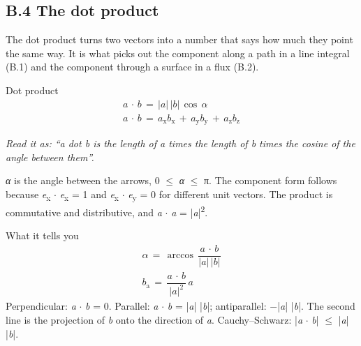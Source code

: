 \documentclass[11pt]{article}
\begin{document}
\begin{keepsection}
\section{B.4 The dot product}

The dot product turns two vectors into a number that says how much they point the same way. It is what picks out the component along a path in a line integral (B.1) and the component through a surface in a flux (B.2).

\begin{equationcard}{Dot product}
\[ \begin{gathered} {a}\, \cdot \, {b}\, =\, |{a}|\, |{b}|\, \cos \, {α} \\ {a}\, \cdot \, {b}\, =\, {a}_{\mathrm{x}}{b}_{\mathrm{x}}\, +\, {a}_{\mathrm{y}}{b}_{\mathrm{y}}\, +\, {a}_{\mathrm{z}}{b}_{\mathrm{z}} \end{gathered} \]
{\small \emph{Read it as: “a dot b is the length of a times the length of b times the cosine of the angle between them”.}\par \textit{α} is the angle between the arrows, 0 \ensuremath{\leq} \textit{α} \ensuremath{\leq} π. The component form follows because \textit{e}\textsubscript{x} \ensuremath{\cdot} \textit{e}\textsubscript{x} = 1 and \textit{e}\textsubscript{x} \ensuremath{\cdot} \textit{e}\textsubscript{y} = 0 for different unit vectors. The product is commutative and distributive, and \textit{a} \ensuremath{\cdot} \textit{a} = |\textit{a}|\textsuperscript{2}.}
\end{equationcard}

\begin{equationcard}{What it tells you}
\[ \begin{gathered} {α}\, =\, \arccos \, \dfrac{{a}\, \cdot \, {b}}{|{a}|\, |{b}|} \\ {b}_{\mathrm{a}}\, =\, \dfrac{{a}\, \cdot \, {b}}{|{a}|^{2}}\, {a} \end{gathered} \]
{\small Perpendicular: \textit{a} \ensuremath{\cdot} \textit{b} = 0. Parallel: \textit{a} \ensuremath{\cdot} \textit{b} = |\textit{a}| |\textit{b}|; antiparallel: \ensuremath{-}|\textit{a}| |\textit{b}|. The second line is the projection of \textit{b} onto the direction of \textit{a}. Cauchy–Schwarz: |\textit{a} \ensuremath{\cdot} \textit{b}| \ensuremath{\leq} |\textit{a}| |\textit{b}|.}
\end{equationcard}


\end{keepsection}
\end{document}
